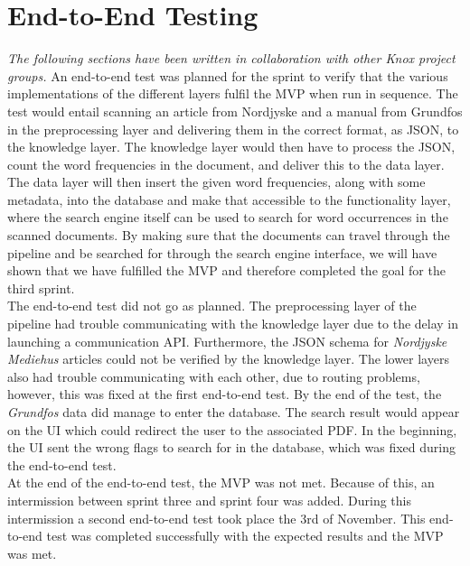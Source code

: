 \chapter{End-to-End Testing}\label{scrumofscrumendtotend}
\textit{The following sections have been written in collaboration with other Knox project groups.}
An end-to-end test was planned for the sprint to verify that the various implementations of the different layers fulfil the MVP when run in sequence. The test would entail scanning an article from Nordjyske and a manual from Grundfos in the preprocessing layer and delivering them in the correct format, as JSON, to the knowledge layer. The knowledge layer would then have to process the JSON, count the word frequencies in the document, and deliver this to the data layer. The data layer will then insert the given word frequencies, along with some metadata, into the database and make that accessible to the functionality layer, where the search engine itself can be used to search for word occurrences in the scanned documents.
By making sure that the documents can travel through the pipeline and be searched for through the search engine interface, we will have shown that we have fulfilled the MVP and therefore completed the goal for the third sprint.\\
The end-to-end test did not go as planned. The preprocessing layer of the pipeline had trouble communicating with the knowledge layer due to the delay in launching a communication API. Furthermore, the JSON schema for \textit{Nordjyske Mediehus} articles could not be verified by the knowledge layer.
The lower layers also had trouble communicating with each other, due to routing problems, however, this was fixed at the first end-to-end test. By the end of the test, the \textit{Grundfos} data did manage to enter the database. The search result would appear on the UI which could redirect the user to the associated PDF. In the beginning, the UI sent the wrong flags to search for in the database, which was fixed during the end-to-end test.\\
At the end of the end-to-end test, the MVP was not met. Because of this, an intermission between sprint three and sprint four was added. During this intermission a second end-to-end test took place the 3rd of November. This end-to-end test was completed successfully with the expected results and the MVP was met.